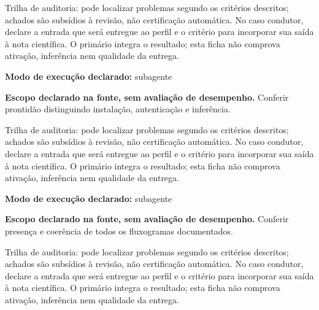 \begin{funcao}
Trilha de auditoria: pode localizar problemas segundo os critérios descritos; achados são subsídios à revisão, não certificação automática. No caso condutor, declare a entrada que será entregue ao perfil e o critério para incorporar sua saída à nota científica. O primário integra o resultado; esta ficha não comprova ativação, inferência nem qualidade da entrega.
\end{funcao}

\begin{arquitetura}
\textbf{Modo de execução declarado:} subagente
\end{arquitetura}


\begin{descricao}
\textbf{Escopo declarado na fonte, sem avaliação de desempenho.}
Conferir prontidão distinguindo instalação, autenticação e inferência.
\end{descricao}

\begin{funcao}
Trilha de auditoria: pode localizar problemas segundo os critérios descritos; achados são subsídios à revisão, não certificação automática. No caso condutor, declare a entrada que será entregue ao perfil e o critério para incorporar sua saída à nota científica. O primário integra o resultado; esta ficha não comprova ativação, inferência nem qualidade da entrega.
\end{funcao}

\begin{arquitetura}
\textbf{Modo de execução declarado:} subagente
\end{arquitetura}


\begin{descricao}
\textbf{Escopo declarado na fonte, sem avaliação de desempenho.}
Conferir presença e coerência de todos os fluxogramas documentados.
\end{descricao}

\begin{funcao}
Trilha de auditoria: pode localizar problemas segundo os critérios descritos; achados são subsídios à revisão, não certificação automática. No caso condutor, declare a entrada que será entregue ao perfil e o critério para incorporar sua saída à nota científica. O primário integra o resultado; esta ficha não comprova ativação, inferência nem qualidade da entrega.
\end{funcao}

